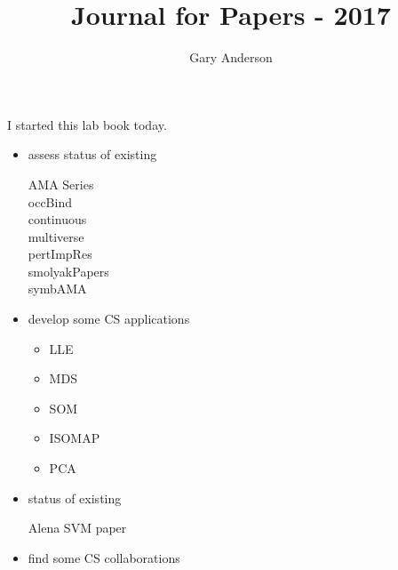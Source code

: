 \documentclass[hyperref]{labbook}
\begin{document}
\frontmatter
\title{Journal for Papers  - 2017}
\author{Gary Anderson }
\maketitle

\printindex
\tableofcontents

\mainmatter



I started this lab book today.




\begin{itemize}
\item assess status of existing
  \begin{description}
  \item[AMA Series]
\item[occBind]
\item[continuous]
\item[multiverse]
\item[pertImpRes]
\item[smolyakPapers]
\item[symbAMA]
  \end{description}

\item develop some CS applications
  \begin{itemize}
  \item LLE
  \item MDS
  \item SOM
  \item ISOMAP
  \item PCA
  \end{itemize}

\end{itemize}




\begin{itemize}
\item status of existing
  \begin{description}
  \item[Alena SVM paper] 
  \end{description}
\item find some CS collaborations
\end{itemize}
\end{document}
